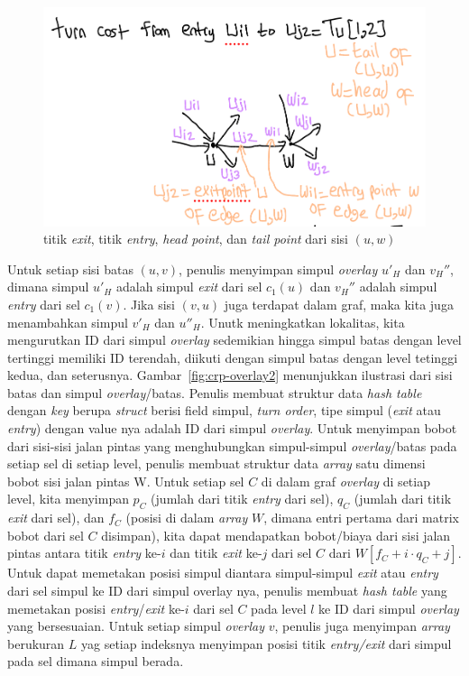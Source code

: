 \begin{figure}[H]
    \includegraphics[scale=0.4]{figures/turn_cost_exit_entry.png}
    \caption{titik \textit{exit}, titik \textit{entry}, \textit{head point}, dan \textit{tail point} dari sisi $(u,w)$}
    \label{fig:crp-exit-entry-point}
\end{figure}


Untuk setiap sisi batas $(u,v)$, penulis menyimpan simpul \textit{overlay} $u'_{H}$ dan $v_{H}''$, dimana simpul $u'_{H}$  adalah simpul \textit{exit} dari sel $c_1(u)$ dan $v_{H}''$ adalah simpul \textit{entry} dari sel $c_1(v)$. Jika sisi $(v,u)$ juga terdapat dalam graf, maka kita juga menambahkan simpul $v'_H$ dan $u''_{H}$. Unutk meningkatkan lokalitas, kita mengurutkan ID dari simpul \textit{overlay} sedemikian hingga simpul batas dengan level tertinggi memiliki ID terendah, diikuti dengan simpul batas dengan level tetinggi kedua, dan seterusnya. Gambar~\ref{fig:crp-overlay2} menunjukkan ilustrasi dari sisi batas dan simpul \textit{overlay}/batas. Penulis membuat struktur data \textit{hash table} dengan \textit{key} berupa \textit{struct} berisi field simpul, \textit{turn order}, tipe simpul (\textit{exit} atau \textit{entry}) dengan value nya adalah ID dari simpul \textit{overlay}. Untuk menyimpan bobot dari sisi-sisi jalan pintas yang menghubungkan simpul-simpul \textit{overlay}/batas pada setiap sel di setiap level, penulis membuat struktur data \textit{array} satu dimensi bobot sisi jalan pintas W. Untuk setiap sel $C$  di dalam graf \textit{overlay} di setiap level, kita menyimpan $p_C$ (jumlah dari titik \textit{entry} dari sel), $q_C$ (jumlah dari titik \textit{exit} dari sel), dan $f_C$ (posisi di dalam \textit{array} $W$, dimana entri pertama dari matrix bobot dari sel $C$ disimpan), kita dapat mendapatkan bobot/biaya dari sisi jalan pintas antara titik \textit{entry} ke-$i$ dan titik \textit{exit} ke-$j$ dari sel $C$ dari $W[f_C+i\cdot q_C + j]$. Untuk dapat memetakan posisi simpul diantara simpul-simpul \textit{exit} atau \textit{entry} dari sel simpul ke ID dari simpul overlay nya, penulis membuat \textit{hash table} yang memetakan posisi \textit{entry}/\textit{exit} ke-$i$ dari sel $C$ pada level $l$ ke ID dari simpul \textit{overlay} yang bersesuaian. Untuk setiap simpul \textit{overlay} $v$, penulis juga menyimpan \textit{array} berukuran $L$ yag setiap indeksnya menyimpan posisi titik \textit{entry/exit} dari simpul pada sel dimana simpul berada.



